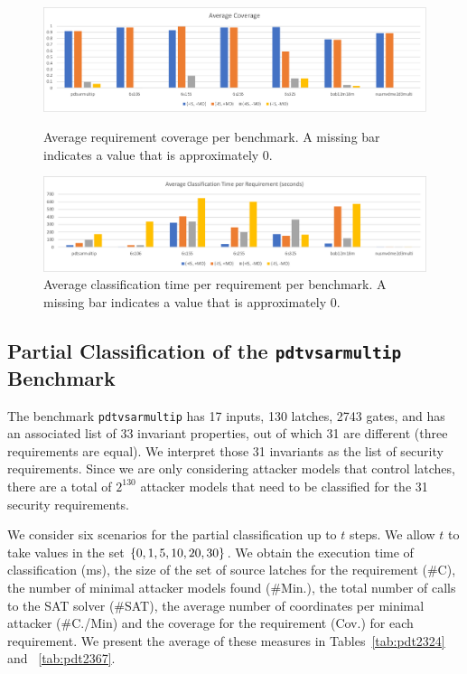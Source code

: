 \begin{figure}[!t]
\centering
\includegraphics[width=\textwidth]{AverageCoverage}
\caption{Average requirement coverage per benchmark. A missing bar indicates a value that is approximately 0.}
\label{fig:Classification:AverageCoverage}
\vspace{0.5cm}
\includegraphics[width=\textwidth]{AverageExecutionTime}
\caption{Average classification time per requirement per benchmark. A missing bar indicates a value that is approximately 0. }
\label{fig:Classification:AverageExecTime}
\end{figure}


\subsection{Partial Classification of the \texttt{pdtvsarmultip} Benchmark}
The benchmark \texttt{pdtvsarmultip} has 17 inputs, %
130 latches, %
2743 gates, %
and has an associated list of 33 invariant properties, out of which 31 are different (three requirements are equal). We interpret those 31 invariants as the list of security requirements. 
Since we are only considering attacker models that control latches, there are a total of $2^{130}$ attacker models that need to be classified for the 31 security requirements.

We consider six scenarios for the partial classification up to $t$ steps. We allow $t$ to take values in the set $\left\{0,1,5,10,20,30\right\}$. We obtain the execution time of classification (ms), the size of the set of source latches for the requirement (\#C), the number of minimal attacker models found (\#Min.), the total number of calls to the SAT solver (\#SAT), the average number of coordinates per minimal attacker (\#C./Min) and the coverage for the requirement (Cov.) for each requirement. We present the average of these measures in Tables~\ref{tab:pdt2324} and ~\ref{tab:pdt2367}. 

